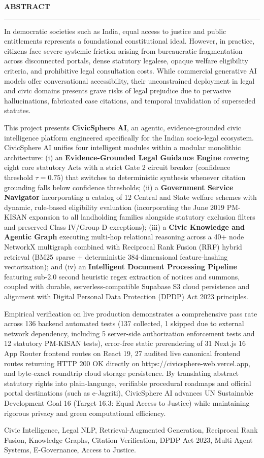 \thispagestyle{empty}
\begin{center}
{\Large {\bf \uppercase{Abstract}}}
\end{center}
\vspace{\baselineskip}
\hrule
\vspace{1.5\baselineskip}
\justifying

\noindent In democratic societies such as India, equal access to justice and public entitlements represents a foundational constitutional ideal. However, in practice, citizens face severe systemic friction arising from bureaucratic fragmentation across disconnected portals, dense statutory legalese, opaque welfare eligibility criteria, and prohibitive legal consultation costs. While commercial generative AI models offer conversational accessibility, their unconstrained deployment in legal and civic domains presents grave risks of legal prejudice due to pervasive hallucinations, fabricated case citations, and temporal invalidation of superseded statutes.

This project presents \textbf{CivicSphere AI}, an agentic, evidence-grounded civic intelligence platform engineered specifically for the Indian socio-legal ecosystem. CivicSphere AI unifies four intelligent modules within a modular monolithic architecture: (i) an \textbf{Evidence-Grounded Legal Guidance Engine} covering eight core statutory Acts with a strict Gate 2 circuit breaker (confidence threshold $\tau = 0.75$) that switches to deterministic synthesis whenever citation grounding falls below confidence thresholds; (ii) a \textbf{Government Service Navigator} incorporating a catalog of 12 Central and State welfare schemes with dynamic, rule-based eligibility evaluation (incorporating the June 2019 PM-KISAN expansion to all landholding families alongside statutory exclusion filters and preserved Class IV/Group D exceptions); (iii) a \textbf{Civic Knowledge and Agentic Graph} executing multi-hop relational reasoning across a 40+ node NetworkX multigraph combined with Reciprocal Rank Fusion (RRF) hybrid retrieval (BM25 sparse + deterministic 384-dimensional feature-hashing vectorization); and (iv) an \textbf{Intelligent Document Processing Pipeline} featuring sub-2.0 second heuristic regex extraction of notices and summons, coupled with durable, serverless-compatible Supabase S3 cloud persistence and alignment with Digital Personal Data Protection (DPDP) Act 2023 principles.

Empirical verification on live production demonstrates a comprehensive pass rate across 136 backend automated tests (137 collected, 1 skipped due to external network dependency, including 5 server-side authorization enforcement tests and 12 statutory PM-KISAN tests), error-free static prerendering of 31 Next.js 16 App Router frontend routes on React 19, 27 audited live canonical frontend routes returning HTTP 200 OK directly on https://civicsphere-web.vercel.app, and byte-exact roundtrip cloud storage persistence. By translating abstract statutory rights into plain-language, verifiable procedural roadmaps and official portal destinations (such as e-Jagriti), CivicSphere AI advances UN Sustainable Development Goal 16 (Target 16.3: Equal Access to Justice) while maintaining rigorous privacy and green computational efficiency.

\bigskip
{} Civic Intelligence, Legal NLP, Retrieval-Augmented Generation, Reciprocal Rank Fusion, Knowledge Graphs, Citation Verification, DPDP Act 2023, Multi-Agent Systems, E-Governance, Access to Justice.

